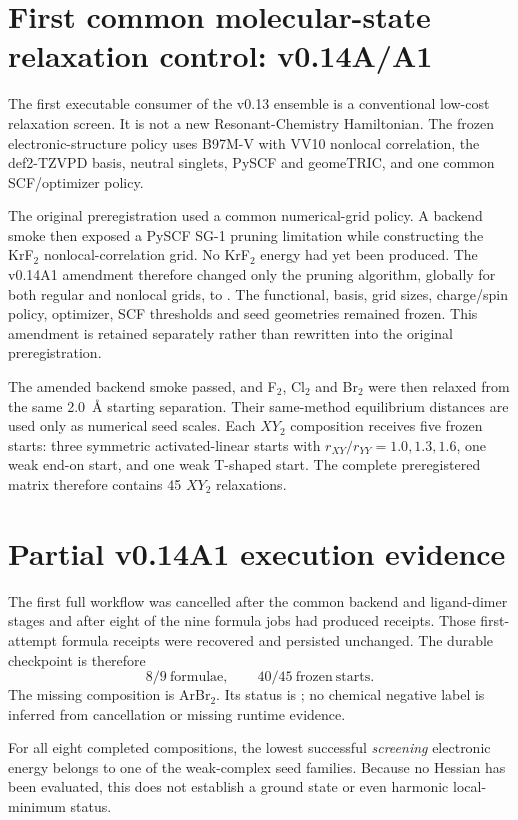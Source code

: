 \section{First common molecular-state relaxation control: v0.14A/A1}
The first executable consumer of the v0.13 ensemble is a conventional low-cost relaxation screen.  It is not a new Resonant-Chemistry Hamiltonian.  The frozen electronic-structure policy uses B97M-V with VV10 nonlocal correlation, the def2-TZVPD basis, neutral singlets, PySCF and geomeTRIC, and one common SCF/optimizer policy.

The original preregistration used a common numerical-grid policy.  A backend smoke then exposed a PySCF SG-1 pruning limitation while constructing the KrF$_2$ nonlocal-correlation grid.  No KrF$_2$ energy had yet been produced.  The v0.14A1 amendment therefore changed only the pruning algorithm, globally for both regular and nonlocal grids, to .  The functional, basis, grid sizes, charge/spin policy, optimizer, SCF thresholds and seed geometries remained frozen.  This amendment is retained separately rather than rewritten into the original preregistration.

The amended backend smoke passed, and F$_2$, Cl$_2$ and Br$_2$ were then relaxed from the same 2.0~\AA{} starting separation.  Their same-method equilibrium distances are used only as numerical seed scales.  Each $XY_2$ composition receives five frozen starts: three symmetric activated-linear starts with $r_{XY}/r_{YY}=1.0,1.3,1.6$, one weak end-on start, and one weak T-shaped start.  The complete preregistered matrix therefore contains 45 $XY_2$ relaxations.

\section{Partial v0.14A1 execution evidence}
The first full workflow was cancelled after the common backend and ligand-dimer stages and after eight of the nine formula jobs had produced receipts.  Those first-attempt formula receipts were recovered and persisted unchanged.  The durable checkpoint is therefore
\begin{equation}
8/9\ \mathrm{formulae},\qquad 40/45\ \mathrm{frozen\ starts}.
\end{equation}
The missing composition is ArBr$_2$.  Its status is ; no chemical negative label is inferred from cancellation or missing runtime evidence.

For all eight completed compositions, the lowest successful \emph{screening} electronic energy belongs to one of the weak-complex seed families.  Because no Hessian has been evaluated, this does not establish a ground state or even harmonic local-minimum status.

